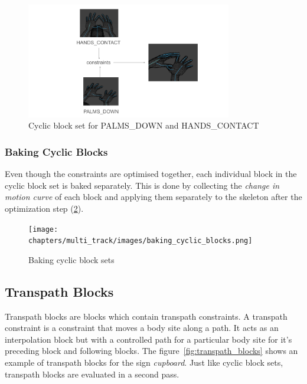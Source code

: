 \documentclass[../../main.tex]{subfiles}
\begin{document}
\begin{figure}[h]
    \centering
    \includegraphics[width=0.8\textwidth]{chapters/multi_track/images/cyclic_blocks.png}
    \caption{Cyclic block set for PALMS\_DOWN and HANDS\_CONTACT}
    \label{fig:cyclic_blocks}
\end{figure}

\subsubsection{Baking Cyclic Blocks}
\label{ch:multi_track:second_pass:cyclic_blocks:baking_cyclic_blocks}

Even though the constraints are optimised together, each individual block in the cyclic block set is baked separately. This is done by collecting the \emph{change in motion curve} of each block and applying them separately to the skeleton after the optimization step (\ref{fig:baking_cyclic_blocks}).

\begin{figure}
    \centering
    \texttt{[image: chapters/multi\_track/images/baking\_cyclic\_blocks.png]}
    \caption{Baking cyclic block sets}
    \label{fig:baking_cyclic_blocks}
\end{figure}

\subsection{Transpath Blocks}
\label{ch:multi_track:second_pass:transpath_blocks}

Transpath blocks are blocks which contain transpath constraints. A transpath constraint is a constraint that moves a body site along a path. It acts as an interpolation block but with a controlled path for a particular body site for it's preceding block and following blocks. The figure~\ref{fig:transpath_blocks} shows an example of transpath blocks for the sign \emph{cupboard}. Just like cyclic block sets, transpath blocks are evaluated in a second pass.
\end{document}
